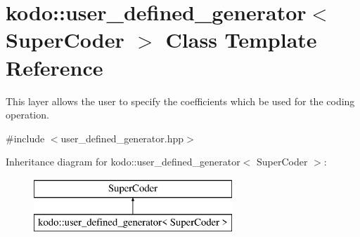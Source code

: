 \hypertarget{classkodo_1_1user__defined__generator}{\section{kodo\-:\-:user\-\_\-defined\-\_\-generator$<$ Super\-Coder $>$ Class Template Reference}
\label{classkodo_1_1user__defined__generator}
}


This layer allows the user to specify the coefficients which be used for the coding operation.  




{\ttfamily \#include $<$user\-\_\-defined\-\_\-generator.\-hpp$>$}

Inheritance diagram for kodo\-:\-:user\-\_\-defined\-\_\-generator$<$ Super\-Coder $>$\-:\begin{figure}[H]
\begin{center}
\leavevmode
\includegraphics[height=2.000000cm]{classkodo_1_1user__defined__generator}
\end{center}
\end{figure}
